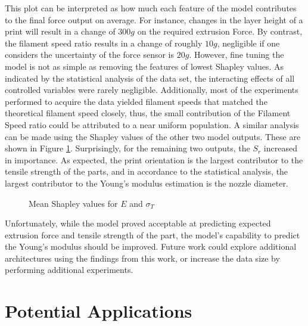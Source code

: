 \documentclass[main.tex]{subfiles}
\begin{document}
This plot can be interpreted as how much each feature of the model contributes to the final force output on average. For instance, changes in the layer height of a print will result in a change of $300 g$ on the required extrusion Force. By contrast, the filament speed ratio results in a change of roughly $10g$, negligible if one considers the uncertainty of the force sensor is $20 g$. However, fine tuning the model is not as simple as removing the features of lowest Shapley values. As indicated by the statistical analysis of the data set, the interacting effects of all controlled variables were rarely negligible. Additionally, most of the experiments performed to acquire the data yielded filament speeds that matched the theoretical filament speed closely, thus, the small contribution of the Filament Speed ratio could be attributed to a near uniform population. A similar analysis can be made using the Shapley values of the other two model outputs. These are shown in Figure \ref{fig:ETS_shap}. Surprisingly, for the remaining two outputs, the $S_r$ increased in importance. As expected, the print orientation is the largest contributor to the tensile strength of the parts, and in accordance to the statistical analysis, the largest contributor to the Young's modulus estimation is the nozzle diameter. 

\begin{figure}[!htbp]
	\center
	\linebreak
	\caption{Mean Shapley values for $E$ and $\sigma_{T}$} \label{fig:ETS_shap}
\end{figure}

Unfortunately, while the model proved acceptable at predicting expected extrusion force and tensile strength of the part, the model's capability to predict the Young's modulus should be improved. Future work could explore additional architectures using the findings from this work, or increase the data size by performing additional experiments.
   
\section{Potential Applications}\label{sec:app}
\end{document}
